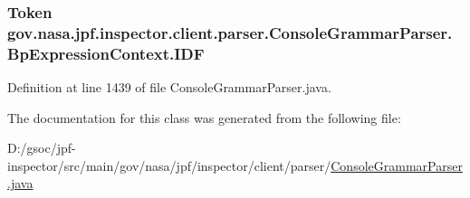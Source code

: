 \subsubsection[{\texorpdfstring{I\+DF}{IDF}}]{\setlength{\rightskip}{0pt plus 5cm}Token gov.\+nasa.\+jpf.\+inspector.\+client.\+parser.\+Console\+Grammar\+Parser.\+Bp\+Expression\+Context.\+I\+DF}\hypertarget{classgov_1_1nasa_1_1jpf_1_1inspector_1_1client_1_1parser_1_1_console_grammar_parser_1_1_bp_expression_context_ae274354e8f2efbcc0e967780c6316aba}{}\label{classgov_1_1nasa_1_1jpf_1_1inspector_1_1client_1_1parser_1_1_console_grammar_parser_1_1_bp_expression_context_ae274354e8f2efbcc0e967780c6316aba}


Definition at line 1439 of file Console\+Grammar\+Parser.\+java.



The documentation for this class was generated from the following file\+:\begin{DoxyCompactItemize}
\item 
D\+:/gsoc/jpf-\/inspector/src/main/gov/nasa/jpf/inspector/client/parser/\hyperlink{_console_grammar_parser_8java}{Console\+Grammar\+Parser.\+java}\end{DoxyCompactItemize}
